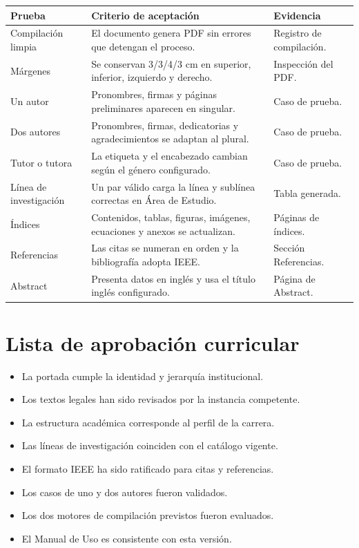 \documentclass[12pt,a4paper,oneside]{report}
\begin{document}
\begin{longtable}{|p{4.1cm}|p{5.2cm}|p{3.3cm}|}
  \hline
  \textbf{Prueba} & \textbf{Criterio de aceptación} & \textbf{Evidencia} \\
  \hline
  Compilación limpia & El documento genera PDF sin errores que detengan el proceso. & Registro de compilación. \\
  \hline
  Márgenes & Se conservan 3/3/4/3 cm en superior, inferior, izquierdo y derecho. & Inspección del PDF. \\
  \hline
  Un autor & Pronombres, firmas y páginas preliminares aparecen en singular. & Caso de prueba. \\
  \hline
  Dos autores & Pronombres, firmas, dedicatorias y agradecimientos se adaptan al plural. & Caso de prueba. \\
  \hline
  Tutor o tutora & La etiqueta y el encabezado cambian según el género configurado. & Caso de prueba. \\
  \hline
  Línea de investigación & Un par válido carga la línea y sublínea correctas en Área de Estudio. & Tabla generada. \\
  \hline
  Índices & Contenidos, tablas, figuras, imágenes, ecuaciones y anexos se actualizan. & Páginas de índices. \\
  \hline
  Referencias & Las citas se numeran en orden y la bibliografía adopta IEEE. & Sección Referencias. \\
  \hline
  Abstract & Presenta datos en inglés y usa el título inglés configurado. & Página de Abstract. \\
  \hline
\end{longtable}

\section{Lista de aprobación curricular}

\begin{itemize}
  \item[$\square$] La portada cumple la identidad y jerarquía institucional.
  \item[$\square$] Los textos legales han sido revisados por la instancia competente.
  \item[$\square$] La estructura académica corresponde al perfil de la carrera.
  \item[$\square$] Las líneas de investigación coinciden con el catálogo vigente.
  \item[$\square$] El formato IEEE ha sido ratificado para citas y referencias.
  \item[$\square$] Los casos de uno y dos autores fueron validados.
  \item[$\square$] Los dos motores de compilación previstos fueron evaluados.
  \item[$\square$] El Manual de Uso es consistente con esta versión.
\end{itemize}
\end{document}
